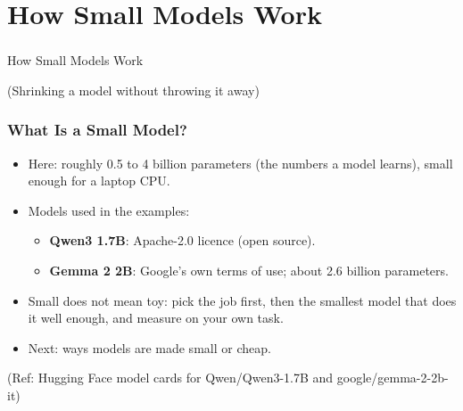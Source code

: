 
\section[Models]{How Small Models Work}

\begin{frame}[fragile]\frametitle{}
\begin{center}
{\Large How Small Models Work}

\medskip
{\small (Shrinking a model without throwing it away)}
\end{center}
\end{frame}

\begin{frame}[fragile]\frametitle{What Is a Small Model?}
\begin{itemize}
\item Here: roughly 0.5 to 4 billion parameters (the numbers a model learns), small enough for a laptop CPU.
\item Models used in the examples:
	\begin{itemize}
	\item \textbf{Qwen3 1.7B}: Apache-2.0 licence (open source).
	\item \textbf{Gemma 2 2B}: Google's own terms of use; about 2.6 billion parameters.
	\end{itemize}
\item Small does not mean toy: pick the job first, then the smallest model that does it well enough, and measure on your own task.
\item Next: ways models are made small or cheap.
\end{itemize}
{\tiny (Ref: Hugging Face model cards for Qwen/Qwen3-1.7B and google/gemma-2-2b-it)}
\end{frame}

